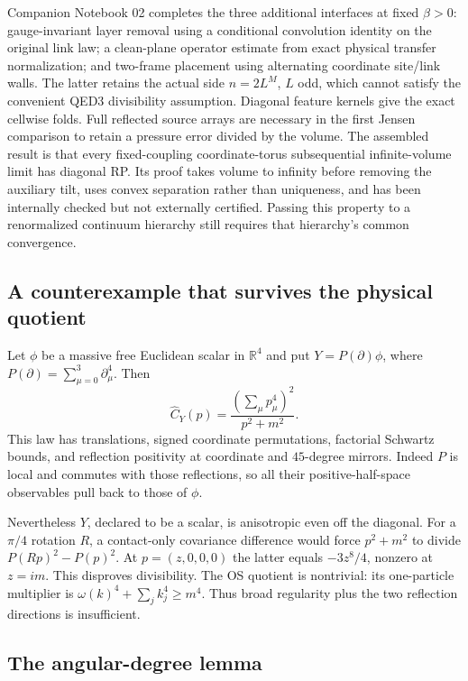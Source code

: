 \documentclass[11pt]{article}
\theoremstyle{remark}
\newcommand{\R}{\mathbb R}
\begin{document}
Companion Notebook 02 completes the three additional interfaces at fixed
$\beta>0$: gauge-invariant layer removal using a conditional convolution
identity on the original link law; a clean-plane operator estimate from
exact physical transfer normalization; and two-frame placement using
alternating coordinate site/link walls. The latter retains the actual
side $n=2L^M$, $L$ odd, which cannot satisfy the convenient QED3
divisibility assumption. Diagonal feature kernels give the exact
cellwise folds. Full reflected source arrays are necessary in the first
Jensen comparison to retain a pressure error divided by the volume.
The assembled result is that every fixed-coupling coordinate-torus
subsequential infinite-volume limit has diagonal RP. Its proof takes
volume to infinity before removing the auxiliary tilt, uses convex
separation rather than uniqueness, and has been internally checked but
not externally certified. Passing this property to a renormalized
continuum hierarchy still requires that hierarchy's common convergence.

\subsection{A counterexample that survives the physical quotient}

Let $\phi$ be a massive free Euclidean scalar in $\R^4$ and put
$Y=P(\partial)\phi$, where $P(\partial)=\sum_{\mu=0}^3\partial_\mu^4$.
Then
\[
\widehat C_Y(p)=\frac{(\sum_\mu p_\mu^4)^2}{p^2+m^2}.
\]
This law has translations, signed coordinate permutations, factorial
Schwartz bounds, and reflection positivity at coordinate and $45$-degree
mirrors. Indeed $P$ is local and commutes with those reflections, so all
their positive-half-space observables pull back to those of $\phi$.

Nevertheless $Y$, declared to be a scalar, is anisotropic even off the
diagonal. For a $\pi/4$ rotation $R$, a contact-only covariance difference
would force $p^2+m^2$ to divide $P(Rp)^2-P(p)^2$.
At $p=(z,0,0,0)$ the latter equals $-3z^8/4$, nonzero at $z=im$.
This disproves divisibility. The OS quotient is nontrivial: its
one-particle multiplier is
$\omega(k)^4+\sum_jk_j^4\geq m^4$.
Thus broad regularity plus the two reflection directions is insufficient.

\subsection{The angular-degree lemma}
\end{document}
